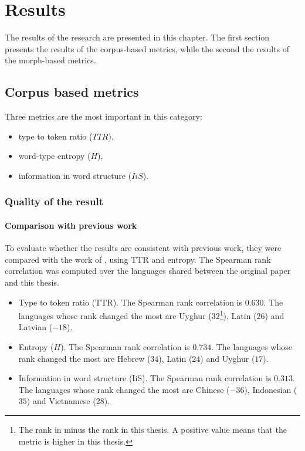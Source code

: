 \chapter{Results}

The results of the research are presented in this chapter. The first section presents the results of the corpus-based metrics, while the second the results of the morph-based metrics. 

\section{Corpus based metrics}

Three metrics are the most important in this category:
\begin{itemize}
    \item type to token ratio ($TTR$),
    \item word-type entropy ($H$),
    \item information in word structure ($IiS$).
\end{itemize}

\subsection{Quality of the result}

\subsubsection{Comparison with previous work}

To evaluate whether the results are consistent with previous work, they were compared with the work of \textcite{Coltekin2022}, using TTR and entropy. The Spearman rank correlation was computed over the languages shared between the original paper and this thesis.
\begin{itemize}
    \item Type to token ratio ($\text{TTR}$). The Spearman rank correlation is $0.630$. The languages whose rank changed the most are Uyghur ($32$\footnote{The rank in \textcite{Coltekin2022} minus the rank in this thesis. A positive value means that the metric is higher in this thesis.}), Latin ($26$) and Latvian ($-18$).
    \item Entropy ($H$). The Spearman rank correlation is $0.734$. The languages whose rank changed the most are Hebrew ($34$), Latin ($24$) and Uyghur ($17$).
    \item Information in word structure (IiS). The Spearman rank correlation is $0.313$. The languages whose rank changed the most are Chinese ($-36$), Indonesian ($35$) and Vietnamese ($28$).
\end{itemize}

